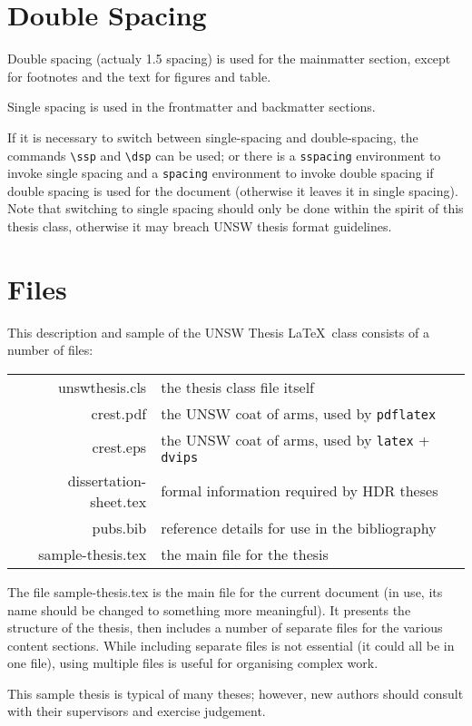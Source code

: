 \section{Double Spacing}
Double spacing (actualy 1.5 spacing) is used for the mainmatter section, except for
footnotes and the text for figures and table.

Single spacing is used in the frontmatter and backmatter sections.

If it is necessary to switch between single-spacing and double-spacing, the commands \verb+\ssp+ and \verb+\dsp+ can be used; or there is a \verb+sspacing+ environment to invoke single spacing and a \verb+spacing+ environment to invoke double spacing if double spacing is used for the document (otherwise it leaves it in single spacing).  Note that switching to single spacing should only be done within the spirit of this thesis class, otherwise it may breach UNSW thesis format guidelines.

\section{Files}

This description and sample of the UNSW Thesis \LaTeX\ class consists of a number of files:

\quad\begin{tabular}{rl}
unswthesis.cls & the thesis class file itself\\[2ex]
crest.pdf & the UNSW coat of arms, used by \verb+pdflatex+ \\
crest.eps & the UNSW coat of arms, used by \verb+latex+ + \verb+dvips+ \\[2ex]
dissertation-sheet.tex & formal information required by HDR theses\\[2ex]
pubs.bib & reference details for use in the bibliography\\[2ex]
sample-thesis.tex & the main file for the thesis
\end{tabular}

The file sample-thesis.tex is the main file for the current document (in use,
its name should be changed to something more meaningful).  It presents
the structure of the thesis, then includes a number of separate files
for the various content sections.  While including separate files is
not essential (it could all be in one file), using multiple files is
useful for organising complex work.

This sample thesis is typical of many theses; however, new authors should
consult with their supervisors and exercise judgement.

